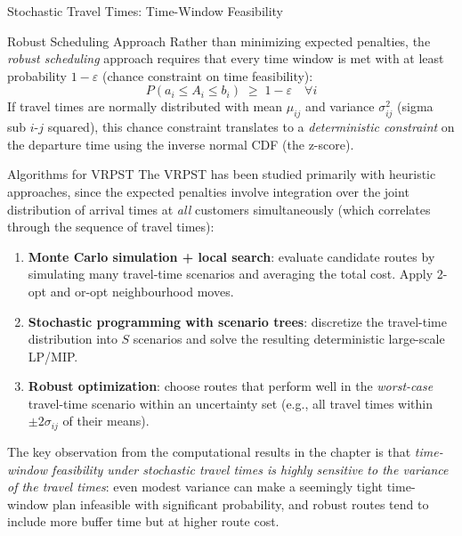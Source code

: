 \documentclass[aspectratio=169,10pt]{beamer}
\begin{document}
\begin{frame}[allowframebreaks]{Stochastic Travel Times: Time-Window Feasibility}
  \begin{block}{Robust Scheduling Approach}
    Rather than minimizing expected penalties, the \emph{robust
    scheduling} approach requires that every time window is met with at
    least probability $1-\varepsilon$ (chance constraint on time feasibility):
    \[
      P(a_i \leq A_i \leq b_i) \;\geq\; 1-\varepsilon
      \quad \forall i
    \]
    If travel times are normally distributed with mean $\mu_{ij}$ and
    variance $\sigma_{ij}^2$ (sigma sub $i$-$j$ squared), this chance
    constraint translates to a \emph{deterministic constraint} on the
    departure time using the inverse normal CDF (the z-score).
  \end{block}

  \framebreak

  \begin{block}{Algorithms for VRPST}
    The VRPST has been studied primarily with heuristic approaches, since
    the expected penalties involve integration over the joint distribution
    of arrival times at \emph{all} customers simultaneously (which
    correlates through the sequence of travel times):

    \begin{enumerate}
      \item \textbf{Monte Carlo simulation + local search}: evaluate
            candidate routes by simulating many travel-time scenarios
            and averaging the total cost.  Apply 2-opt and or-opt
            neighbourhood moves.

      \item \textbf{Stochastic programming with scenario trees}:
            discretize the travel-time distribution into $S$ scenarios
            and solve the resulting deterministic large-scale LP/MIP.

      \item \textbf{Robust optimization}: choose routes that perform
            well in the \emph{worst-case} travel-time scenario within
            an uncertainty set (e.g., all travel times within
            $\pm 2\sigma_{ij}$ of their means).
    \end{enumerate}
  \end{block}

  The key observation from the computational results in the chapter is
  that \emph{time-window feasibility under stochastic travel times is
  highly sensitive to the variance of the travel times}: even modest
  variance can make a seemingly tight time-window plan infeasible with
  significant probability, and robust routes tend to include more
  buffer time but at higher route cost.

\end{frame}
\end{document}

